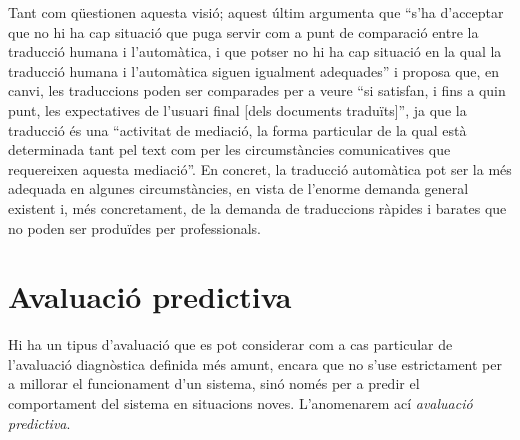 Tant \citet{krauwer93j} com \citet{sager93b} qüestionen aquesta visió;
aquest últim argumenta que ``s'ha d'acceptar que no hi ha cap situació
que puga servir com a punt de comparació entre la traducció humana i
l'automàtica, i que potser no hi ha cap situació en la qual la
traducció humana i l'automàtica siguen igualment adequades'' i proposa
que, en canvi, les traduccions poden ser comparades per a veure ``si
satisfan, i fins a quin punt, les expectatives de l'usuari final [dels
documents traduïts]'', ja que la traducció és una ``activitat de
mediació, la forma particular de la qual està determinada tant pel
text com per les circumstàncies comunicatives que requereixen aquesta
mediació''.  En concret, la
traducció automàtica pot ser la més adequada en algunes
circumstàncies, en vista de l'enorme demanda general existent i, més
concretament, de la demanda de traduccions ràpides i barates que no
poden ser produïdes per professionals.

\section{Avaluació predictiva}
\label{ss:avalpred}

Hi ha un tipus d'avaluació que es pot considerar com a cas particular
de l'avaluació diagnòstica definida més amunt, encara que no s'use
estrictament per a millorar el funcionament d'un sistema, sinó només
per a predir el comportament del sistema en situacions noves.
L'anomenarem ací \emph{avaluació predictiva}.

